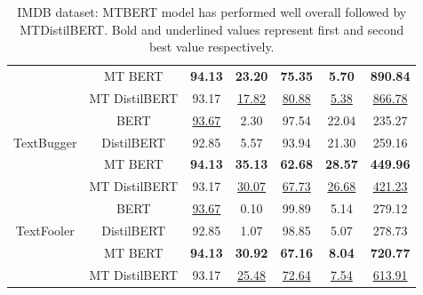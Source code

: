 \documentclass[%
	BCOR=8mm, %
	DIV=12,
	toc=bibliography, %
	toc=listof, %
	oneside, %
	egregdoesnotlikesansseriftitles, %
	]{scrbook}
\begin{document}
\begin{table}[H]
{\begin{tabular}{|c|c|c|c|c|c|c|}
                     & MT BERT &              \textbf{  94.13 }&                   \textbf{ 23.20} &                 \textbf{ 75.35} &                      \textbf{5.70} &          \textbf{ 890.84} \\
                     & MT DistilBERT &                93.17 &                   \underline{ 17.82} &                  \underline{80.88} &                     \underline{ 5.38} &           \underline{866.78} \\
                \midrule
                     & BERT &               		\underline{ 93.67} &                     2.30 &                  97.54 &                     22.04 &           235.27 \\
 TextBugger & DistilBERT &                92.85 &                     5.57 &                  93.94 &                     21.30 &           259.16 \\
                     & MT BERT &                \textbf{94.13} &                    \textbf{35.13} &                 \textbf{ 62.68} &                     \textbf{28.57} &           \textbf{449.96} \\
                     & MT DistilBERT &          93.17 &                   \underline{ 30.07} &                  \underline{67.73} &                     \underline{26.68} &           \underline{421.23} \\
                \midrule
                    & BERT &                		\underline{93.67} &                     0.10 &                  99.89 &                      5.14 &           279.12 \\
  TextFooler & DistilBERT &                92.85 &                     1.07 &                  98.85 &                      5.07 &           278.73 \\
                    & MT BERT &                \textbf{94.13} &          \textbf{ 30.92}&     \textbf{67.16} &        \textbf{8.04} &   \textbf{720.77} \\
                    & MT DistilBERT &          93.17 &                    \underline{25.48 }&                  \underline{72.64} &                     \underline{ 7.54 }&           \underline{613.91} \\
 \bottomrule
 \end{tabular}
    }
    \caption[Experiment result of IMDB dataset]{IMDB dataset: MTBERT model has performed well overall followed by MTDistilBERT. Bold and underlined values represent first and second best value respectively.}
    \label{table:IMDBExpRes}
\end{table}
\end{document}
